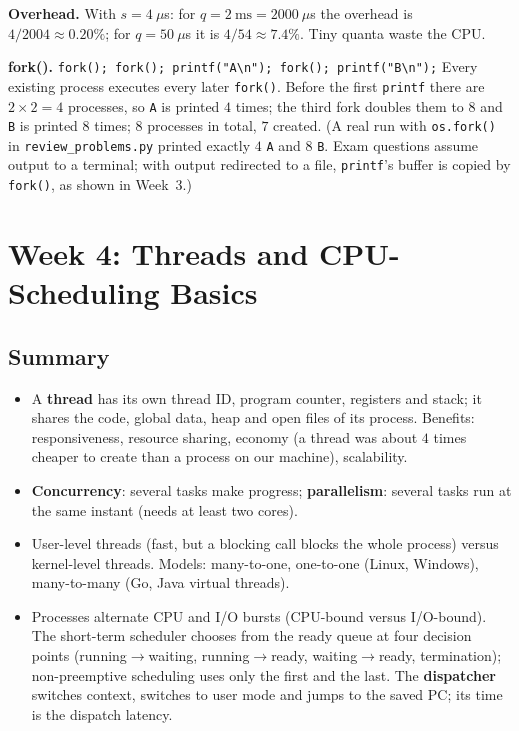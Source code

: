 \documentclass[11pt,a4paper]{article}
\newcommand{\term}[1]{\textbf{\color{mintdeep}#1}}
\newcommand{\cmd}[1]{\texttt{#1}}
\begin{document}
\begin{example}
\textbf{Overhead.} With $s = 4\ \mu$s: for $q = 2\ \text{ms} = 2000\ \mu$s the overhead is $4/2004 \approx 0.20\%$; for $q = 50\ \mu$s it is $4/54 \approx 7.4\%$. Tiny quanta waste the CPU.

\textbf{fork().} \cmd{fork(); fork(); printf("A\textbackslash n"); fork(); printf("B\textbackslash n");} Every existing process executes every later \cmd{fork()}. Before the first \cmd{printf} there are $2 \times 2 = 4$ processes, so \texttt{A} is printed $4$ times; the third fork doubles them to $8$ and \texttt{B} is printed $8$ times; $8$ processes in total, $7$ created. (A real run with \cmd{os.fork()} in \texttt{review\_problems.py} printed exactly $4$ \texttt{A} and $8$ \texttt{B}. Exam questions assume output to a terminal; with output redirected to a file, \cmd{printf}'s buffer is copied by \cmd{fork()}, as shown in Week~3.)
\end{example}

\section{Week 4: Threads and CPU-Scheduling Basics}
\label{sec:w4}
\subsection*{Summary}
\begin{itemize}
  \item A \term{thread} has its own thread ID, program counter, registers and stack; it shares the code, global data, heap and open files of its process. Benefits: responsiveness, resource sharing, economy (a thread was about $4$ times cheaper to create than a process on our machine), scalability.
  \item \term{Concurrency}: several tasks make progress; \term{parallelism}: several tasks run at the same instant (needs at least two cores).
  \item User-level threads (fast, but a blocking call blocks the whole process) versus kernel-level threads. Models: many-to-one, one-to-one (Linux, Windows), many-to-many (Go, Java virtual threads).
  \item Processes alternate CPU and I/O bursts (CPU-bound versus I/O-bound). The short-term scheduler chooses from the ready queue at four decision points (running$\to$waiting, running$\to$ready, waiting$\to$ready, termination); non-preemptive scheduling uses only the first and the last. The \term{dispatcher} switches context, switches to user mode and jumps to the saved PC; its time is the dispatch latency.
\end{itemize}
\end{document}
